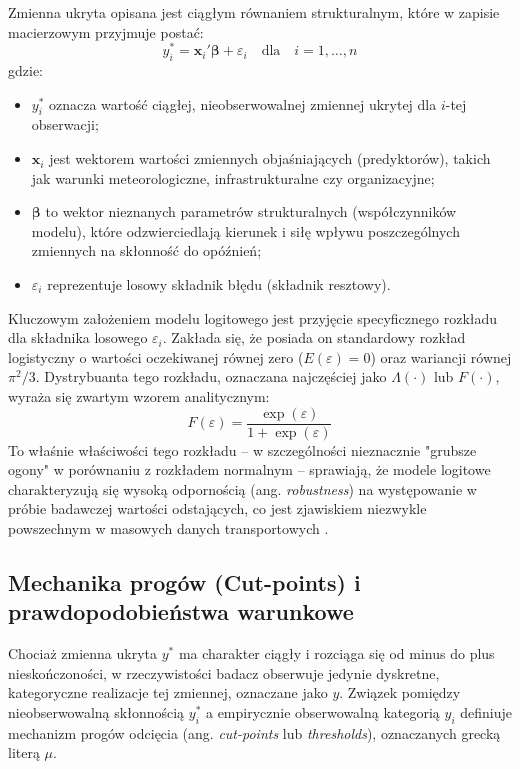 Zmienna ukryta opisana jest ciągłym równaniem strukturalnym, które w zapisie macierzowym przyjmuje postać:
\begin{equation}
    y_i^* = \mathbf{x}_i' \boldsymbol{\beta} + \varepsilon_i \quad \text{dla} \quad i = 1, \dots, n
\end{equation}
gdzie:
\begin{itemize}
    \item $y_i^*$ oznacza wartość ciągłej, nieobserwowalnej zmiennej ukrytej dla $i$-tej obserwacji;
    \item $\mathbf{x}_i$ jest wektorem wartości zmiennych objaśniających (predyktorów), takich jak warunki meteorologiczne, infrastrukturalne czy organizacyjne;
    \item $\boldsymbol{\beta}$ to wektor nieznanych parametrów strukturalnych (współczynników modelu), które odzwierciedlają kierunek i siłę wpływu poszczególnych zmiennych na skłonność do opóźnień;
    \item $\varepsilon_i$ reprezentuje losowy składnik błędu (składnik resztowy).
\end{itemize}

Kluczowym założeniem modelu logitowego jest przyjęcie specyficznego rozkładu dla składnika losowego $\varepsilon_i$. Zakłada się, że posiada on standardowy rozkład logistyczny o wartości oczekiwanej równej zero ($E(\varepsilon) = 0$) oraz wariancji równej $\pi^2/3$. Dystrybuanta tego rozkładu, oznaczana najczęściej jako $\Lambda(\cdot)$ lub $F(\cdot)$, wyraża się zwartym wzorem analitycznym:
\begin{equation}
    F(\varepsilon) = \frac{\exp(\varepsilon)}{1 + \exp(\varepsilon)}
\end{equation}
To właśnie właściwości tego rozkładu – w szczególności nieznacznie "grubsze ogony" w porównaniu z rozkładem normalnym – sprawiają, że modele logitowe charakteryzują się wysoką odpornością (ang. \textit{robustness}) na występowanie w próbie badawczej wartości odstających, co jest zjawiskiem niezwykle powszechnym w masowych danych transportowych \cite{hastie2009}.



\subsection{Mechanika progów (Cut-points) i prawdopodobieństwa warunkowe}

Chociaż zmienna ukryta $y^*$ ma charakter ciągły i rozciąga się od minus do plus nieskończoności, w rzeczywistości badacz obserwuje jedynie dyskretne, kategoryczne realizacje tej zmiennej, oznaczane jako $y$. Związek pomiędzy nieobserwowalną skłonnością $y_i^*$ a empirycznie obserwowalną kategorią $y_i$ definiuje mechanizm progów odcięcia (ang. \textit{cut-points} lub \textit{thresholds}), oznaczanych grecką literą $\mu$.

